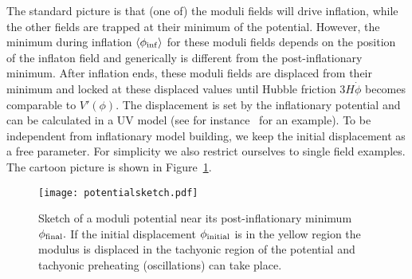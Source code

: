 \documentclass[12pt]{article}
\begin{document}
The standard picture is that (one of) the moduli fields will drive inflation, while the other fields are trapped at their minimum of the potential. However, the minimum during inflation $\langle\phi_{\rm inf}\rangle$ for these moduli fields depends on the position of the inflaton field and generically is different from the post-inflationary minimum. After inflation ends, these moduli fields are displaced from their minimum and locked at these displaced values until Hubble friction $3H\dot{\phi}$ becomes comparable to $V'(\phi).$
The displacement is set by the inflationary potential and can be calculated in a UV model (see for instance~\cite{Cicoli:2016olq} for an example). To be independent from inflationary model building, we keep the initial displacement as a free parameter. For simplicity we also restrict ourselves to single field examples. The cartoon picture is shown in Figure~\ref{fig:potentialsketch}.

\begin{figure}
\begin{center}
\texttt{[image: potentialsketch.pdf]}
\end{center}
\caption{Sketch of a moduli potential near its post-inflationary minimum $\phi_{\rm final}.$ If the initial displacement $\phi_{\rm initial}$ is in the yellow region the modulus is displaced in the tachyonic region of the potential and tachyonic preheating (oscillations) can take place.}
\label{fig:potentialsketch}
\end{figure}
\end{document}
